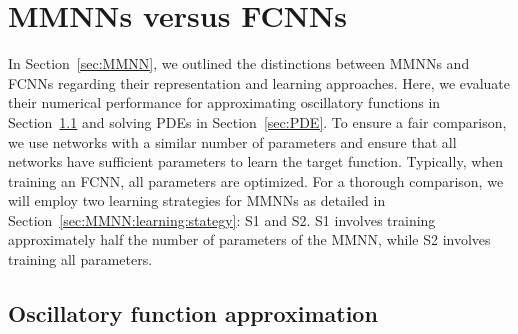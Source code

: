 \documentclass[review,hidelinks,onefignum,onetabnum]{siamart250211}
\begin{document}




\section{MMNNs versus FCNNs}\label{sec:comparison}

In Section~\ref{sec:MMNN}, we outlined the distinctions between MMNNs and FCNNs regarding their representation and learning approaches. Here, we evaluate their numerical performance for approximating oscillatory functions in Section~\ref{sec:1D2Dfunction} and solving PDEs in Section~\ref{sec:PDE}.
To ensure a fair comparison, we use networks with a similar number of parameters and ensure that all networks have sufficient parameters to learn the target function. Typically, when training an FCNN, all parameters are optimized. For a thorough comparison, we will employ two learning strategies for MMNNs as detailed in Section~\ref{sec:MMNN:learning:stategy}: S1 and S2. S1 involves training approximately half the number of parameters of the MMNN, while S2 involves training all parameters.


\subsection{Oscillatory function approximation}\label{sec:1D2Dfunction}
\end{document}
